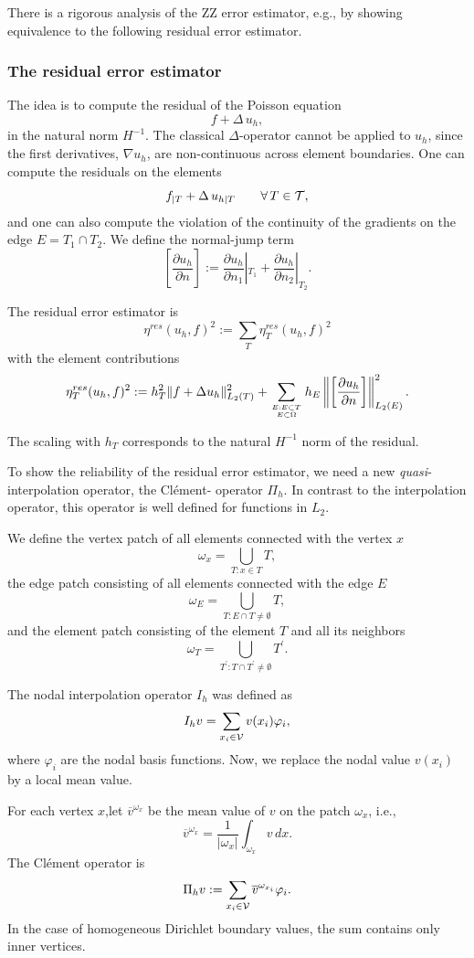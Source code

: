 There is a rigorous analysis of the ZZ error estimator, e.g., by showing equivalence
to the following residual error estimator.

\subsubsection{The residual error estimator}
The idea is to compute the residual of the Poisson equation
$$
f + \Delta \, u_h,
$$
in the natural norm $H^{-1}$. The classical $\Delta$-operator cannot be 
applied  to $u_h$, since the first derivatives, $\nabla u_h$, are non-continuous across element 
boundaries. One can compute the residuals on the elements
$$
f_{|T} + \Delta \, u_{h|T} \qquad \forall \, T \in {\cal T},
$$
and one can also compute the violation of the continuity of the gradients on the
edge $E = T_1 \cap T_2$.  We define the normal-jump term
$$
\left[\frac{\partial u_h}{\partial n} \right] := 
\frac{\partial u_h}{\partial n_1}|_{T_1} + 
\frac{\partial u_h}{\partial n_2}|_{T_2}.
$$

The residual error estimator is
$$
\eta^{res}(u_h,f)^2 := \sum_T \eta_T^{res}(u_h,f)^2
$$
with the element contributions
$$
\eta_T^{res}(u_h, f)^2 := h_T^2 \| f + \Delta u_h \|_{L_2(T)}^2 +
 \sum_{E : E \subset T \atop E \subset \Omega} h_E \left\| \left[ \frac{\partial u_h}{\partial n} \right] \right\|_{L_2(E)} ^2.
$$

The scaling with $h_T$ corresponds to the natural $H^{-1}$ norm of the residual.

\bigskip

To show the reliability of the residual error estimator, we need a new
{\em quasi}-interpolation operator, the Cl\'{e}ment- operator $\Pi_h$. In
contrast to the interpolation operator, this operator is well defined
for functions in $L_2$.

We define the vertex patch of all elements connected with the vertex $x$
$$
\omega_x = \bigcup_{T : x \in T} T,
$$
the edge patch consisting of all elements connected with the edge $E$
$$
\omega_E = \bigcup_{T : E \cap T \neq \emptyset} T,
$$
and the element patch consisting of the element $T$ and all its neighbors
$$
\omega_T = \bigcup_{T^\prime : T \cap T^\prime \neq \emptyset} T^\prime.
$$

The nodal interpolation operator $I_h$ was defined as
$$
I_h v = \sum_{x_i \in {\cal V}} v(x_i) \varphi_i,
$$
where $\varphi_i$ are the nodal basis functions.
Now, we replace the nodal value $v(x_i)$ by a local mean value.

\begin{definition} For each vertex $x$,let $\overline{v}^{\omega_x}$ be the mean value of $v$ on the patch $\omega_x$, i.e.,
$$
\overline{v}^{\omega_x} = \frac{1}{|\omega_x|} \int_{\omega_x} v \, dx.
$$
The Cl\'ement operator is 
$$
\Pi_h v := \sum_{x_i \in {\cal V}} \overline{v}^{\omega_{x_i}} \varphi_i.
$$
In the case of homogeneous Dirichlet boundary values, the sum contains only
inner vertices.
\end{definition}


